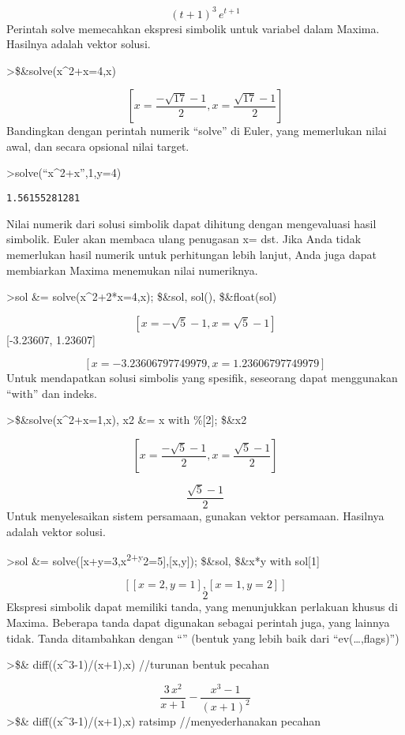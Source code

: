 \documentclass[
]{book}
\begin{document}
\[\left(t+1\right)^3\,e^{t+1}\]Perintah solve memecahkan ekspresi simbolik untuk variabel dalam Maxima. Hasilnya adalah vektor solusi.

\textgreater\$\&solve(x\^{}2+x=4,x)

\[\left[ x=\frac{-\sqrt{17}-1}{2} , x=\frac{\sqrt{17}-1}{2} \right]\]Bandingkan dengan perintah numerik ``solve'' di Euler, yang memerlukan nilai awal, dan secara opsional nilai target.

\textgreater solve(``x\^{}2+x'',1,y=4)

\begin{verbatim}
1.56155281281
\end{verbatim}

Nilai numerik dari solusi simbolik dapat dihitung dengan mengevaluasi hasil simbolik. Euler akan membaca ulang penugasan x= dst. Jika Anda tidak memerlukan hasil numerik untuk perhitungan lebih lanjut, Anda juga dapat membiarkan Maxima menemukan nilai numeriknya.

\textgreater sol \&= solve(x\^{}2+2*x=4,x); \$\&sol, sol(), \$\&float(sol)

\[\left[ x=-\sqrt{5}-1 , x=\sqrt{5}-1 \right]\] {[}-3.23607, 1.23607{]}

\[\left[ x=-3.23606797749979 , x=1.23606797749979 \right]\]Untuk mendapatkan solusi simbolis yang spesifik, seseorang dapat menggunakan ``with'' dan indeks.

\textgreater\$\&solve(x\^{}2+x=1,x), x2 \&= x with \%{[}2{]}; \$\&x2

\[\left[ x=\frac{-\sqrt{5}-1}{2} , x=\frac{\sqrt{5}-1}{2} \right]\]

\[\frac{\sqrt{5}-1}{2}\]Untuk menyelesaikan sistem persamaan, gunakan vektor persamaan. Hasilnya adalah vektor solusi.

\textgreater sol \&= solve({[}x+y=3,x\textsuperscript{2+y}2=5{]},{[}x,y{]}); \$\&sol, \$\&x*y with sol{[}1{]}

\[\left[ \left[ x=2 , y=1 \right]  , \left[ x=1 , y=2 \right] \right]\] \[2\]Ekspresi simbolik dapat memiliki tanda, yang menunjukkan perlakuan khusus di Maxima. Beberapa tanda dapat digunakan sebagai perintah juga, yang lainnya tidak. Tanda ditambahkan dengan ``\textbar{}'' (bentuk yang lebih baik dari ``ev(\ldots,flags)'')

\textgreater\$\& diff((x\^{}3-1)/(x+1),x) //turunan bentuk pecahan

\[\frac{3\,x^2}{x+1}-\frac{x^3-1}{\left(x+1\right)^2}\]\textgreater\$\& diff((x\^{}3-1)/(x+1),x) \textbar{} ratsimp //menyederhanakan pecahan
\end{document}
